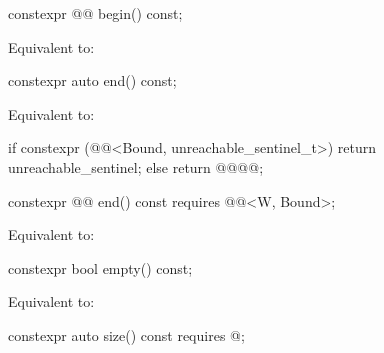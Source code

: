%
\begin{itemdecl}
constexpr @@ begin() const;
\end{itemdecl}

\begin{itemdescr}
\pnum
\effects
Equivalent to: 
\end{itemdescr}

%
\begin{itemdecl}
constexpr auto end() const;
\end{itemdecl}

\begin{itemdescr}
\pnum
\effects
Equivalent to:
\begin{codeblock}
if constexpr (@@<Bound, unreachable_sentinel_t>)
  return unreachable_sentinel;
else
  return @@{@@};
\end{codeblock}
\end{itemdescr}

%
\begin{itemdecl}
constexpr @@ end() const requires @@<W, Bound>;
\end{itemdecl}

\begin{itemdescr}
\pnum
\effects
Equivalent to: 
\end{itemdescr}

%
\begin{itemdecl}
constexpr bool empty() const;
\end{itemdecl}

\begin{itemdescr}
\pnum
\effects
Equivalent to: 
\end{itemdescr}

%
\begin{itemdecl}
constexpr auto size() const requires @\seebelow@;
\end{itemdecl}

